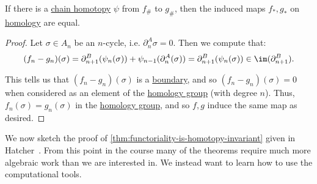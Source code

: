 \begin{theorem}\label{thm:chain-homotopies-on-homology}
	If there is a \hyperref[def:chain-homotopy]{chain homotopy} \(\psi\) from \(f_\#\) to \(g_\#\), then the induced maps \(f_\ast, g_\ast\) on \hyperref[def:homology-group]{homology} are equal.
\end{theorem}
\begin{proof}
	Let \(\sigma \in A_n\) be an \(n\)-cycle, i.e. \(\partial_n^A \sigma = 0\). Then we compute that:
	\[
		(f_n - g_n)(\sigma) = \partial_{n + 1}^B(\psi_n(\sigma)) + \psi_{n - 1}(\partial_n^A(\sigma)) = \partial_{n + 1}^B(\psi_n(\sigma)) \in \im (\partial^B_{n + 1}).
	\]

	This tells us that \((f_n - g_n)(\sigma)\) is a \hyperref[def:boundary]{boundary}, and so \((f_n - g_n)(\sigma) = 0\) when considered as an element of the \hyperref[def:homology-group]{homology group} (with degree \(n\)). Thus, \(f_n(\sigma) = g_n(\sigma)\) in the \hyperref[def:homology-group]{homology group}, and so \(f, g\) induce the same map as desired.
\end{proof}

We now sketch the proof of \autoref{thm:functoriality-is-homotopy-invariant} given in Hatcher~\cite{hatcher2002algebraic}. From this point in the course many of the theorems require much more algebraic work than we are interested in. We instead want to learn how to use the computational tools.

